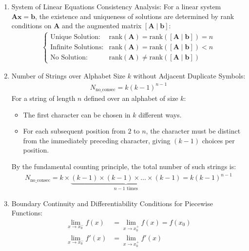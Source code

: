 \begin{enumerate}[label=\thesubsection.\arabic*, ref=\thesubsection.\theenumi, itemsep=0.5cm]
\item System of Linear Equations Consistency Analysis:
For a linear system $\mathbf{A}\mathbf{x} = \mathbf{b}$, the existence and uniqueness of solutions are determined by rank conditions on $\mathbf{A}$ and the augmented matrix $[\mathbf{A} \mid \mathbf{b}]$:
\begin{align}
\begin{cases}
\text{Unique Solution:} & \text{rank}(\mathbf{A}) = \text{rank}([\mathbf{A} \mid \mathbf{b}]) = n \\
\text{Infinite Solutions:} & \text{rank}(\mathbf{A}) = \text{rank}([\mathbf{A} \mid \mathbf{b}]) < n \\
\text{No Solution:} & \text{rank}(\mathbf{A}) \neq \text{rank}([\mathbf{A} \mid \mathbf{b}])
\end{cases}
\label{eq:CS12025-linear_system_rank}
\end{align}

\item Number of Strings over Alphabet Size $k$ without Adjacent Duplicate Symbols:
\begin{align}
N_{\text{no\_consec}} = k(k-1)^{n-1} \label{eq:CS12025-no_consec_strings}
\end{align}
\solution
For a string of length $n$ defined over an alphabet of size $k$:
\begin{itemize}
    \item The first character can be chosen in $k$ different ways.
    \item For each subsequent position from $2$ to $n$, the character must be distinct from the immediately preceding character, giving $(k-1)$ choices per position.
\end{itemize}
By the fundamental counting principle, the total number of such strings is:
\begin{align}
N_{\text{no\_consec}} = k \times \underbrace{(k-1) \times (k-1) \times \dots \times (k-1)}_{n-1 \text{ times}} = k(k-1)^{n-1}
\end{align}

\item Boundary Continuity and Differentiability Conditions for Piecewise Functions:
\begin{align}
\lim_{x \to x_0^-} f(x) &= \lim_{x \to x_0^+} f(x) = f(x_0) \label{eq:CS12025-piecewise_continuity} \\
\lim_{x \to x_0^-} f'(x) &= \lim_{x \to x_0^+} f'(x) \label{eq:CS12025-piecewise_differentiability}
\end{align}


\end{enumerate}
